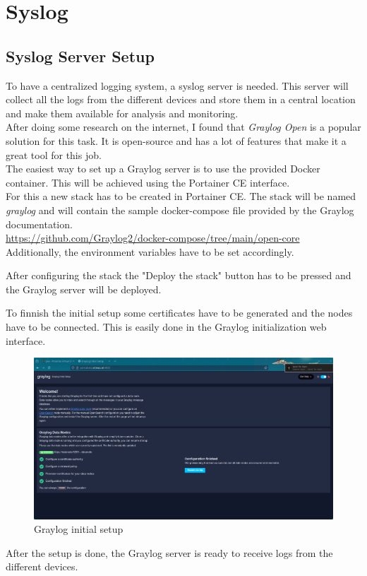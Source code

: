 \section{Syslog}

\subsection{Syslog Server Setup}

To have a centralized logging system, a syslog server is needed. This server will collect all the logs from the different devices and store them in a central location and make them available for analysis and monitoring.\\
After doing some research on the internet, I found that \textit{Graylog Open} is a popular solution for this task. It is open-source and has a lot of features that make it a great tool for this job.\\
The easiest way to set up a Graylog server is to use the provided Docker container. This will be achieved using the Portainer CE interface.\\
For this a new stack has to be created in Portainer CE. The stack will be named \textit{graylog} and will contain the sample docker-compose file provided by the Graylog documentation.\\ 
\url{https://github.com/Graylog2/docker-compose/tree/main/open-core}\\
Additionally, the environment variables have to be set accordingly.

After configuring the stack the "Deploy the stack" button has to be pressed and the Graylog server will be deployed.

To finnish the initial setup some certificates have to be generated and the nodes have to be connected. This is easily done in the Graylog initialization web interface.
\begin{figure}[H]
	\centering
	\includegraphics[width=0.8\linewidth]{Figures/graylog-initial-setup.png}
	\caption{Graylog initial setup}
\end{figure}
After the setup is done, the Graylog server is ready to receive logs from the different devices.


